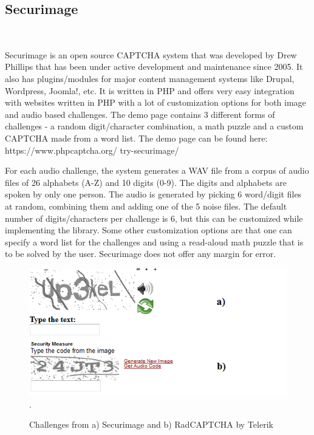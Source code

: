 \subsection{Securimage} \mbox{} \

Securimage is an open source CAPTCHA system that was developed by Drew Phillips that has been under active development and maintenance since 2005. It also has plugins/modules for major content management systems like Drupal, Wordpress, Joomla!, etc. It is written in PHP and offers very easy integration with websites written in PHP with a lot of customization options for both image and audio based challenges. The demo page contains 3 different forms of challenges - a random digit/character combination, a math puzzle and a custom CAPTCHA made from a word list. The demo page can be found here: https://www.phpcaptcha.org/
try-securimage/\newline

For each audio challenge, the system generates a WAV file from a corpus of audio files of 26 alphabets (A-Z) and 10 digits (0-9). The digits and alphabets are spoken by only one person. The audio is generated by picking 6 word/digit files at random, combining them and adding one of the 5 noise files. The default number of digits/characters per challenge is 6, but this can be customized while implementing the library. Some other customization options are that one can specify a word list for the challenges and using a read-aloud math puzzle that is to be solved by the user. Securimage does not offer any margin for error. \newline


\begin{figure}[t]
   \centering
   \includegraphics[width=\columnwidth]{figures/sectel.png}.
   \caption{Challenges from a) Securimage and b) RadCAPTCHA by Telerik}
   \label{fig:speechrecognizers}
\end{figure}


